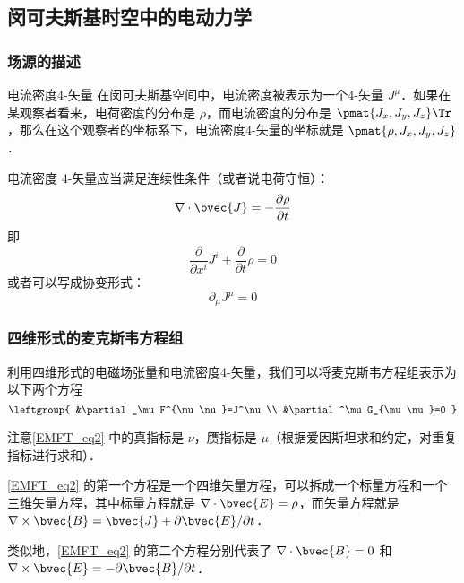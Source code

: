 \subsection{闵可夫斯基时空中的电动力学}

\subsubsection{场源的描述}

\begin{definition}{电流密度4-矢量}
在闵可夫斯基空间中，电流密度被表示为一个4-矢量 $J^\mu$．如果在某观察者看来，电荷密度的分布是 $\rho$，而电流密度的分布是 $\pmat{J_x, J_y, J_z}\Tr$，那么在这个观察者的坐标系下，电流密度4-矢量的坐标就是 $\pmat{\rho, J_x, J_y, J_z}$．
\end{definition}

电流密度 4-矢量应当满足连续性条件（或者说电荷守恒）：
\begin{equation}
\nabla\cdot\bvec{J}=-\frac{\partial\rho}{\partial t}
\end{equation}
即
\begin{equation}
\frac{\partial}{\partial x^i}J^i+\frac{\partial}{\partial t}\rho=0
\end{equation}
或者可以写成协变形式：
\begin{equation}
\partial_\mu J^\mu=0
\end{equation}
\subsubsection{四维形式的麦克斯韦方程组}

利用四维形式的电磁场张量和电流密度4-矢量，我们可以将麦克斯韦方程组表示为以下两个方程
\begin{equation}\label{EMFT_eq2}
\leftgroup{
    &\partial_\mu F^{\mu\nu}=J^\nu\\
    &\partial^\mu G_{\mu\nu}=0
}
\end{equation}

注意\autoref{EMFT_eq2} 中的真指标是 $\nu$，赝指标是 $\mu$（根据爱因斯坦求和约定，对重复指标进行求和）．

\autoref{EMFT_eq2} 的第一个方程是一个四维矢量方程，可以拆成一个标量方程和一个三维矢量方程，其中标量方程就是 $\nabla\cdot\bvec{E}=\rho$，而矢量方程就是 $\nabla\times\bvec{B}=\bvec{J}+\partial\bvec{E}/\partial t$． 

类似地，\autoref{EMFT_eq2} 的第二个方程分别代表了 $\nabla\cdot\bvec{B}=0$ 和 $\nabla\times\bvec{E}=-\partial\bvec{B}/\partial t$．

